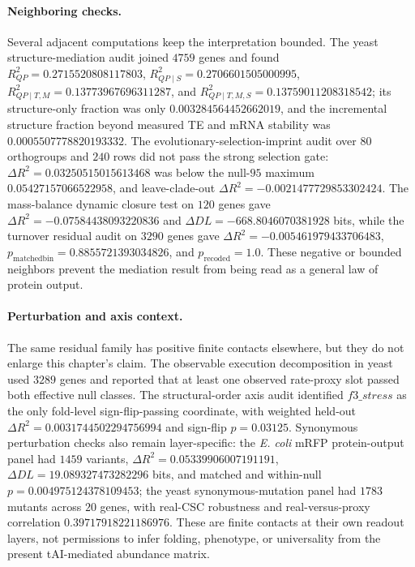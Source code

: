 \paragraph{Neighboring checks.}
Several adjacent computations keep the interpretation bounded. The yeast structure-mediation audit joined $4759$ genes and found $R^2_{QP}=0.2715520808117803$, $R^2_{QP\mid S}=0.2706601505000995$, $R^2_{QP\mid T,M}=0.13773967696311287$, and $R^2_{QP\mid T,M,S}=0.13759011208318542$; its structure-only fraction was only $0.003284564452662019$, and the incremental structure fraction beyond measured TE and mRNA stability was $0.0005507778820193332$. The evolutionary-selection-imprint audit over $80$ orthogroups and $240$ rows did not pass the strong selection gate: $\Delta R^2=0.03250515015613468$ was below the null-$95$ maximum $0.05427157066522958$, and leave-clade-out $\Delta R^2=-0.0021477729853302424$. The mass-balance dynamic closure test on $120$ genes gave $\Delta R^2=-0.07584438093220836$ and $\Delta DL=-668.8046070381928$ bits, while the turnover residual audit on $3290$ genes gave $\Delta R^2=-0.005461979433706483$, $p_{\mathrm{matchedbin}}=0.8855721393034826$, and $p_{\mathrm{recoded}}=1.0$. These negative or bounded neighbors prevent the mediation result from being read as a general law of protein output.

\paragraph{Perturbation and axis context.}
The same residual family has positive finite contacts elsewhere, but they do not enlarge this chapter's claim. The observable execution decomposition in yeast used $3289$ genes and reported that at least one observed rate-proxy slot passed both effective null classes. The structural-order axis audit identified $f3\_stress$ as the only fold-level sign-flip-passing coordinate, with weighted held-out $\Delta R^2=0.0031744502294756994$ and sign-flip $p=0.03125$. Synonymous perturbation checks also remain layer-specific: the \emph{E. coli} mRFP protein-output panel had $1459$ variants, $\Delta R^2=0.05339906007191191$, $\Delta DL=19.089327473282296$ bits, and matched and within-null $p=0.004975124378109453$; the yeast synonymous-mutation panel had $1783$ mutants across $20$ genes, with real-CSC robustness and real-versus-proxy correlation $0.39717918221186976$. These are finite contacts at their own readout layers, not permissions to infer folding, phenotype, or universality from the present tAI-mediated abundance matrix.

